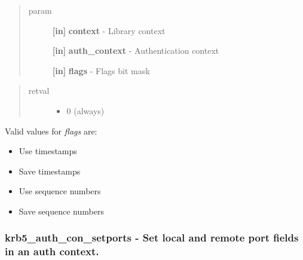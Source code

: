 \documentclass[letterpaper,10pt,english]{sphinxmanual}
\begin{document}
\begin{quote}\begin{description}
\item[{param}] \leavevmode
\textbf{{[}in{]}} \textbf{context} - Library context

\textbf{{[}in{]}} \textbf{auth\_context} - Authentication context

\textbf{{[}in{]}} \textbf{flags} - Flags bit mask

\end{description}\end{quote}
\begin{quote}\begin{description}
\item[{retval}] \leavevmode\begin{itemize}
\item {} 
0   (always)

\end{itemize}

\end{description}\end{quote}

Valid values for \emph{flags} are:
\begin{itemize}
\item {} 
{\hyperref[appdev/refs/macros/KRB5_AUTH_CONTEXT_DO_TIME:KRB5_AUTH_CONTEXT_DO_TIME]{}} Use timestamps

\item {} 
{\hyperref[appdev/refs/macros/KRB5_AUTH_CONTEXT_RET_TIME:KRB5_AUTH_CONTEXT_RET_TIME]{}} Save timestamps

\item {} 
{\hyperref[appdev/refs/macros/KRB5_AUTH_CONTEXT_DO_SEQUENCE:KRB5_AUTH_CONTEXT_DO_SEQUENCE]{}} Use sequence numbers

\item {} 
{\hyperref[appdev/refs/macros/KRB5_AUTH_CONTEXT_RET_SEQUENCE:KRB5_AUTH_CONTEXT_RET_SEQUENCE]{}} Save sequence numbers

\end{itemize}


\subsubsection{krb5\_auth\_con\_setports -  Set local and remote port fields in an auth context.}
\label{appdev/refs/api/krb5_auth_con_setports:krb5-auth-con-setports-set-local-and-remote-port-fields-in-an-auth-context}\label{appdev/refs/api/krb5_auth_con_setports::doc}
\end{document}
